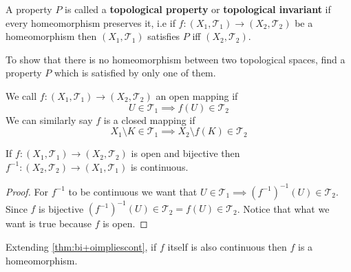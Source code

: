 \documentclass{scrartcl} %
\newcommand{\Tau}{\mathcal{T}}
\begin{document}
\begin{definition}
	A property $P$ is called a \textbf{topological property} or \textbf{topological invariant} if every 
	homeomorphism preserves it, i.e if $f : \left(X_1, \Tau_1\right) \rightarrow \left(X_2, \Tau_2\right)$
	be a homeomorphism then $\left(X_1, \Tau_1\right)$ satisfies $P$ iff $\left(X_2, \Tau_2\right)$. 
\end{definition}
\begin{remark}
To show that there is no homeomorphism between two topological spaces, find a property $P$ which is satisfied
by only one of them.
\end{remark}
\begin{definition}
We call $f: \left(X_1, \Tau_1\right) \rightarrow \left(X_2, \Tau_2\right)$ an open mapping if
\[
U \in \Tau_1 \implies f(U) \in \Tau_2
\]
We can similarly say $f$ is a closed mapping if
\[
	X_1\setminus K \in \Tau_1 \implies X_2 \setminus f\left(K\right) \in \Tau_2
\]
\newpage
\begin{lemma}\label{thm:bi+oimpliescont}
	If $f : \left(X_1, \Tau_1\right) \rightarrow \left(X_2, \Tau_2\right)$ is open and bijective then
	$f^{-1}: \left(X_2, \Tau_2\right) \rightarrow \left(X_1, \Tau_1\right)$ is continuous.
\end{lemma}
\begin{proof}
	For $f^{-1}$ to be continuous we want that $U \in \Tau_1 \implies \left(f^{-1}\right)^{-1}(U) \in \Tau_2$.\\
	Since $f$ is bijective $ \left(f^{-1}\right)^{-1}(U) \in \Tau_2 =  f(U) \in \Tau_2$. Notice that what we want
	is true because $f$ is open.
\end{proof}
\begin{remark}
	Extending \autoref{thm:bi+oimpliescont}, if $f$ itself is also continuous then $f$ is a \\homeomorphism.
\end{remark}
\end{definition}
\end{document}
